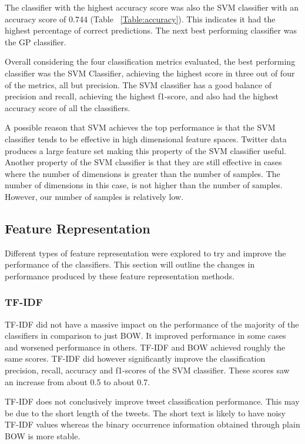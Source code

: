 The classifier with the highest accuracy score was also the SVM classifier with an accuracy score of 0.744 (Table ~\ref{Table:accuracy}). This indicates it had the highest percentage of correct predictions. The next best performing classifier was the GP classifier.

Overall considering the four classification metrics evaluated, the best performing classifier was the SVM Classifier, achieving the highest score in three out of four of the metrics, all but precision. The SVM classifier has a good balance of precision and recall, achieving the highest f1-score, and also had the highest accuracy score of all the classifiers.

A possible reason that SVM achieves the top performance is that the SVM classifier tends to be effective in high dimensional feature spaces. Twitter data produces a large feature set making this property of the SVM classifier useful. Another property of the SVM classifier is that they are still effective in cases where the number of dimensions is greater than the number of samples. The number of dimensions in this case, is not higher than the number of samples. However, our number of samples is relatively low.

\subsection{Feature Representation}

Different types of feature representation were explored to try and improve the performance of the classifiers. This section will outline the changes in performance produced by these feature representation methods. 

\subsubsection*{TF-IDF}
TF-IDF did not have a massive impact on the performance of the majority of the classifiers in comparison to just BOW. It improved performance in some cases and worsened performance in others. TF-IDF and BOW achieved roughly the same scores. TF-IDF did however significantly improve the classification precision, recall, accuracy and f1-scores of the SVM classifier. These scores saw an increase from about 0.5 to about 0.7.

TF-IDF does not conclusively improve tweet classification performance. This may be due to the short length of the tweets. The short text is likely to have noisy TF-IDF values whereas the binary occurrence information obtained through plain BOW is more stable.

